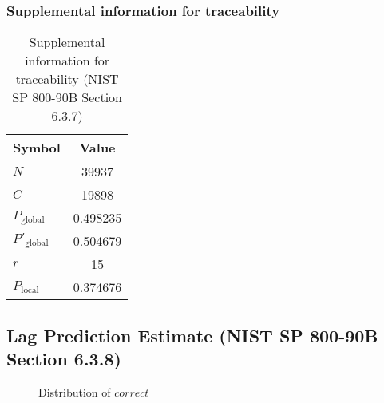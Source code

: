 \documentclass[a3paper,xelatex,english]{bxjsarticle}
\begin{document}
\subsubsection{Supplemental information for traceability}
\renewcommand{\arraystretch}{1.8}
\begin{table}[h]
\caption{Supplemental information for traceability (NIST SP 800-90B Section 6.3.7)}
\begin{center}
\begin{tabular}{|l|c|}
\hline 
\rowcolor{anotherlightblue} %
Symbol				& Value \\ \hline 
$N$				& 39937\\ \hline 
$C$				& 19898\\ \hline 
$P_{\textrm{global}}$				& 0.498235\\ \hline 
$P'_{\textrm{global}}$			& 0.504679\\ \hline 
$r$				& 15\\ \hline 
$P_{\textrm{local}}$ 			& 0.374676\\ \hline
\end{tabular}
\end{center}
\end{table}
\renewcommand{\arraystretch}{1.4}
\clearpage
\subsection{Lag Prediction Estimate (NIST SP 800-90B Section 6.3.8)}
\begin{figure}[htbp]
\caption{Distribution of $correct$}
\end{figure}
\end{document}
